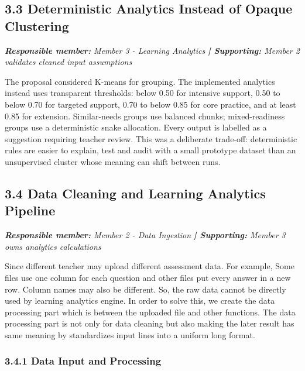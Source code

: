 \documentclass[11pt,a4paper]{article}
\begin{document}
\subsection*{3.3 Deterministic Analytics Instead of Opaque Clustering}


\noindent\textit{\textbf{Responsible member: }Member 3 - Learning Analytics\textbf{ | Supporting: }Member 2 validates cleaned input assumptions}\par

The proposal considered K-means for grouping. The implemented analytics instead uses transparent thresholds: below 0.50 for intensive support, 0.50 to below 0.70 for targeted support, 0.70 to below 0.85 for core practice, and at least 0.85 for extension. Similar-needs groups use balanced chunks; mixed-readiness groups use a deterministic snake allocation. Every output is labelled as a suggestion requiring teacher review. This was a deliberate trade-off: deterministic rules are easier to explain, test and audit with a small prototype dataset than an unsupervised cluster whose meaning can shift between runs.\par

\subsection*{3.4 Data Cleaning and Learning Analytics Pipeline}


\noindent\textit{\textbf{Responsible member: }Member 2 - Data Ingestion\textbf{ | Supporting: }Member 3 owns analytics calculations}\par

Since different teacher may upload different assessment data. For example, Some files use one column for each question and other files put every answer in a new row. Column names may also be different. So, the raw data cannot be directly used by learning analytics engine. In order to solve this, we create the data processing part which is between the uploaded file and other functions. The data processing part is not only for data cleaning but also making the later result has same meaning by standardizes input lines into a uniform long format.\par

\subsubsection*{3.4.1 Data Input and Processing}
\end{document}
